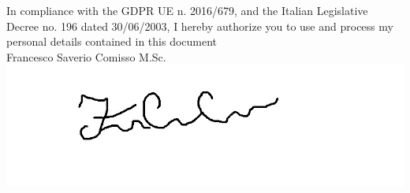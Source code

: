 \documentclass[10pt,a4paper,ragged2e,withhyper]{altacv}
\begin{document}
\begin{paracol}{2}

\medskip









{}


\switchcolumn
\newpage


In compliance with the GDPR UE n. 2016/679, and the Italian Legislative Decree no. 196 dated 30/06/2003, 
I hereby authorize you to use and process my personal details contained in this document
\\

Francesco Saverio Comisso M.Sc.
\includegraphics[height=4\baselineskip]{Firma.jpg}






\end{paracol}
\end{document}
